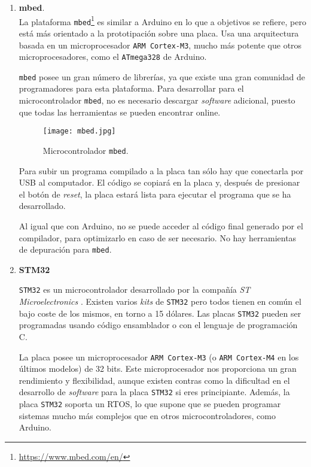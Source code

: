 \begin{enumerate}
\item \textbf{mbed}. \\
La plataforma \texttt{mbed}\footnote{\url{https://www.mbed.com/en/}} \cite{22} es similar a Arduino en lo que a objetivos se refiere, pero está más orientado a la prototipación sobre una placa. Usa una arquitectura basada en un microprocesador \texttt{ARM Cortex-M3}, mucho más potente que otros microprocesadores, como el \texttt{ATmega328} de Arduino. 

\texttt{mbed} posee un gran número de librerías, ya que existe una gran comunidad de programadores para esta plataforma. Para desarrollar para el microcontrolador \texttt{mbed}, no es necesario descargar \textit{software} adicional, puesto que todas las herramientas se pueden encontrar online.

\begin{figure}[!h]
\begin{center}
\texttt{[image: mbed.jpg]}
\caption[]{Microcontrolador \texttt{mbed}. \protect\footnotemark}
\label{fig:mbed}
\end{center}
\end{figure}


Para subir un programa compilado a la placa tan sólo hay que conectarla por \ac{USB} al computador. El código se copiará en la placa y, después de presionar el botón de \textit{reset}, la placa estará lista para ejecutar el programa que se ha desarrollado.

Al igual que con Arduino, no se puede acceder al código final generado por el compilador, para optimizarlo en caso de ser necesario. No hay herramientas de depuración para \texttt{mbed}.

\item \textbf{STM32}

\texttt{STM32} es un microcontrolador desarrollado por la compañía \textit{ST Microelectronics} \cite{23}. Existen varios \textit{kits} de \texttt{STM32} pero todos tienen en común el bajo coste de los mismos, en torno a 15 dólares. Las placas \texttt{STM32} pueden ser programadas usando código ensamblador o con el lenguaje de programación C.

La placa \cite{24} posee un microprocesador \texttt{ARM Cortex-M3} (o \texttt{ARM Cortex-M4} en los últimos modelos) de 32 bits. Este microprocesador nos proporciona un gran rendimiento y flexibilidad, aunque existen contras como la dificultad en el desarrollo de \textit{software} para la placa \texttt{STM32} si eres principiante. Además, la placa \texttt{STM32} soporta un \ac{RTOS}, lo que supone que se pueden programar sistemas mucho más complejos que en otros microcontroladores, como Arduino.


\end{enumerate}
